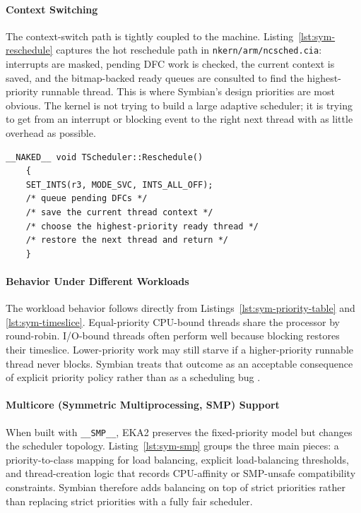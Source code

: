 \paragraph{Context Switching}

The context-switch path is tightly coupled to the machine.
Listing~\ref{lst:sym-reschedule} captures the hot reschedule path in
\texttt{nkern/arm/ncsched.cia}: interrupts are masked, pending DFC work is
checked, the current context is saved, and the bitmap-backed ready queues are
consulted to find the highest-priority runnable thread. This is where Symbian's
design priorities are most obvious. The kernel is not trying to build a large
adaptive scheduler; it is trying to get from an interrupt or blocking event to
the right next thread with as little overhead as possible.

\begin{listing}[H]
\begin{verbatim}
__NAKED__ void TScheduler::Reschedule()
	{
	SET_INTS(r3, MODE_SVC, INTS_ALL_OFF);
	/* queue pending DFCs */
	/* save the current thread context */
	/* choose the highest-priority ready thread */
	/* restore the next thread and return */
	}
\end{verbatim}
\caption{Hot reschedule path in \texttt{arm/ncsched.cia}.}
\label{lst:sym-reschedule}
\end{listing}

\paragraph{Behavior Under Different Workloads}

The workload behavior follows directly from Listings~\ref{lst:sym-priority-table}
and \ref{lst:sym-timeslice}. Equal-priority CPU-bound threads share the
processor by round-robin. I/O-bound threads often perform well because blocking
restores their timeslice. Lower-priority work may still starve if a
higher-priority runnable thread never blocks. Symbian treats that outcome as an
acceptable consequence of explicit priority policy rather than as a scheduling
bug \citep{sales2005, symbian_eka2_kernel}.

\paragraph{Multicore (Symmetric Multiprocessing, SMP) Support}

When built with \texttt{\_\_SMP\_\_}, EKA2 preserves the fixed-priority model
but changes the scheduler topology. Listing~\ref{lst:sym-smp} groups the three
main pieces: a priority-to-class mapping for load balancing, explicit
load-balancing thresholds, and thread-creation logic that records CPU-affinity
or SMP-unsafe compatibility constraints. Symbian therefore adds balancing on
top of strict priorities rather than replacing strict priorities with a fully
fair scheduler.

